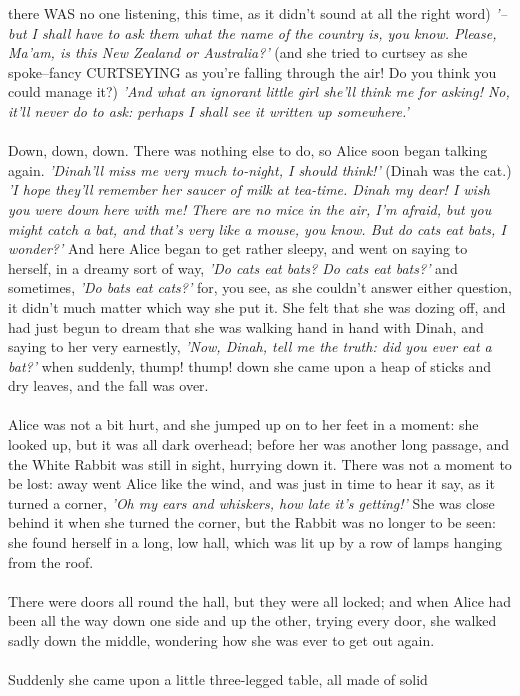 \documentclass[12pt]{article}
\begin{document}
there WAS no one listening, this time, as it didn't sound at all the
right word) \textit{'--but I shall have to ask them what the name of the country
    is, you know. Please, Ma'am, is this New Zealand or Australia?'} (and
she tried to curtsey as she spoke--\textmd{fancy CURTSEYING as you're falling
    through the air!} Do you think you could manage it?) \textit{'And what an
ignorant little girl she'll think me for asking! No, it'll never do to
ask: perhaps I shall see it written up somewhere.'}\\\\Down, down, down. There was nothing else to do, so Alice soon began
talking again. \textit{'Dinah'll miss me very much to-night, I should think!'}
(Dinah was the cat.) \textit{'I hope they'll remember her saucer of milk at
tea-time. Dinah my dear! I wish you were down here with me! There are no
mice in the air, I'm afraid, but you might catch a bat, and that's very
like a mouse, you know. But do cats eat bats, I wonder?'} And here Alice
began to get rather sleepy, and went on saying to herself, in a dreamy
sort of way, \textit{'Do cats eat bats? Do cats eat bats?'} and sometimes, \textit{'Do
bats eat cats?'} for, you see, as she couldn't answer either question,
it didn't much matter which way she put it. She felt that she was dozing
off, and had just begun to dream that she was walking hand in hand with
Dinah, and saying to her very earnestly, \textit{'Now, Dinah, tell me the truth:
did you ever eat a bat?'} when suddenly, thump! thump! down she came upon
a heap of sticks and dry leaves, and the fall was over.\\\\Alice was not a bit hurt, and she jumped up on to her feet in a moment:
she looked up, but it was all dark overhead; before her was another
long passage, and the White Rabbit was still in sight, hurrying down it.
There was not a moment to be lost: away went Alice like the wind, and
was just in time to hear it say, as it turned a corner, \textit{'Oh my ears
and whiskers, how late it's getting!'} She was close behind it when she
turned the corner, but the Rabbit was no longer to be seen: she found
herself in a long, low hall, which was lit up by a row of lamps hanging
from the roof.\\\\There were doors all round the hall, but they were all locked; and when
Alice had been all the way down one side and up the other, trying every
door, she walked sadly down the middle, wondering how she was ever to
get out again.\\\\Suddenly she came upon a little three-legged table, all made of solid
\end{document}
